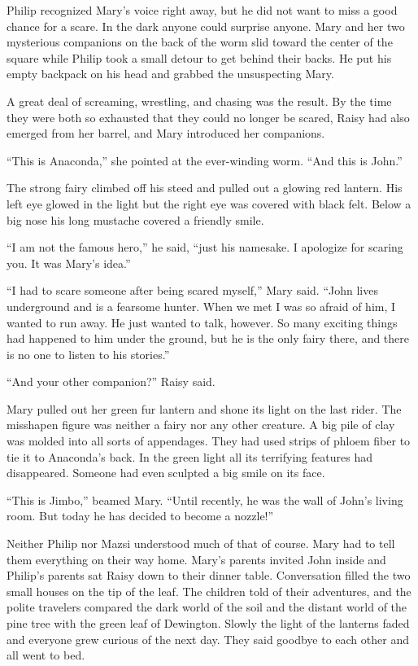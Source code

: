 \documentclass[10pt, draft]{memoir}
\begin{document}
Philip recognized Mary's voice right away, but he did not want to miss a good
chance for a scare. In the dark anyone could surprise anyone. Mary and her two
mysterious companions on the back of the worm slid toward the center of the
square while Philip took a small detour to get behind their backs. He put his
empty backpack on his head and grabbed the unsuspecting Mary.

A great deal of screaming, wrestling, and chasing was the result. By the time
they were both so exhausted that they could no longer be scared, Raisy had also
emerged from her barrel, and Mary introduced her companions.

``This is Anaconda,'' she pointed at the ever-winding worm. ``And this is
John.''

The strong fairy climbed off his steed and pulled out a glowing red lantern.
His left eye glowed in the light but the right eye was covered with black felt.
Below a big nose his long mustache covered a friendly smile.

``I am not the famous hero,'' he said, ``just his namesake. I apologize for
scaring you. It was Mary's idea.''

``I had to scare someone after being scared myself,'' Mary said. ``John lives
underground and is a fearsome hunter. When we met I was so afraid of him, I
wanted to run away. He just wanted to talk, however. So many exciting things
had happened to him under the ground, but he is the only fairy there, and there
is no one to listen to his stories.''

``And your other companion?'' Raisy said.

Mary pulled out her green fur lantern and shone its light on the last rider.
The misshapen figure was neither a fairy nor any other creature. A big pile of
clay was molded into all sorts of appendages. They had used strips of phloem
fiber to tie it to Anaconda's back. In the green light all its terrifying
features had disappeared. Someone had even sculpted a big smile on its face.

``This is Jimbo,'' beamed Mary. ``Until recently, he was the wall of John's
living room. But today he has decided to become a nozzle!''

Neither Philip nor Mazsi understood much of that of course. Mary had to tell
them everything on their way home. Mary's parents invited John inside and
Philip's parents sat Raisy down to their dinner table. Conversation filled the
two small houses on the tip of the leaf. The children told of their adventures,
and the polite travelers compared the dark world of the soil and the distant
world of the pine tree with the green leaf of Dewington. Slowly the light of
the lanterns faded and everyone grew curious of the next day. They said goodbye
to each other and all went to bed.
\end{document}
